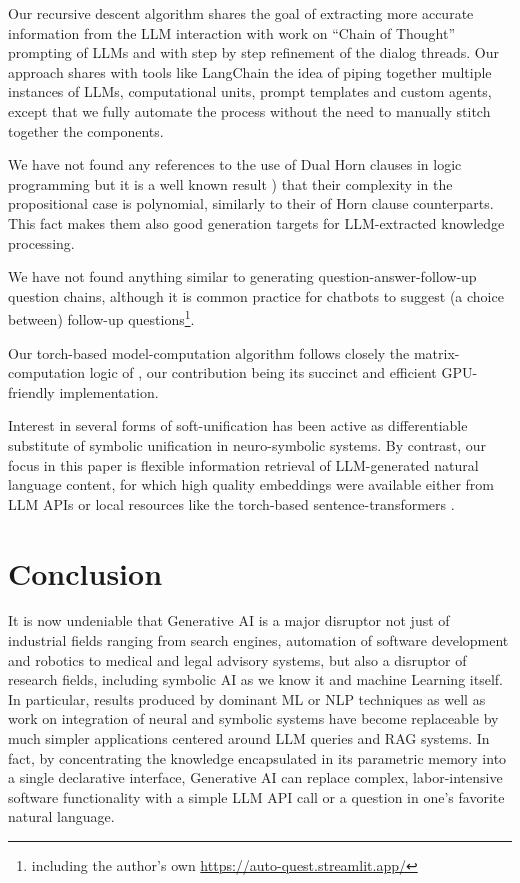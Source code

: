\documentclass[submission,copyright,creativecommons]{eptcs}
\begin{document}
Our recursive descent algorithm shares the goal of extracting more accurate information from the LLM interaction with work on ``Chain of Thought'' prompting of LLMs \cite{chainofthought,ling2023deductive} and with step by step \cite{lightman2023lets} refinement of the dialog threads. 
Our approach shares with tools like LangChain \cite{langchain} the idea of piping together multiple instances of LLMs, computational units, prompt templates and custom agents, except that we fully automate the process without the need to manually stitch together the components.

We have not found any references to the use of Dual Horn clauses in logic programming but it is a well known result \cite{schaefer78}) that their complexity in the propositional case is polynomial, similarly to their of Horn clause counterparts. This fact makes them also good generation targets for LLM-extracted knowledge processing. 

We have not found anything similar to generating question-answer-follow-up question chains, although it is common practice for chatbots to  suggest (a choice between) follow-up questions\footnote{ including the author's own \url{https://auto-quest.streamlit.app/}}.

Our torch-based model-computation algorithm follows closely the matrix-computation logic of \cite{linalg_lp}, our contribution being its succinct and efficient GPU-friendly implementation.

Interest in several forms of soft-unification has been active  \cite{soft_unif,ltn22,deepsoftlog23} as differentiable substitute of symbolic unification in neuro-symbolic systems.
By contrast, our focus in this paper is flexible information retrieval of LLM-generated natural language content, for which high quality embeddings were available either from LLM APIs or local resources like the torch-based sentence-transformers \cite{sbert}.

\section{Conclusion}\label{conc}

It is now undeniable that Generative AI is a major disruptor not just of industrial fields ranging from search engines, automation of software development and robotics to medical and legal advisory systems,
but also a disruptor of research fields, including symbolic AI as we know it and machine Learning itself. In particular, results produced by dominant ML or NLP techniques as well as work on integration of neural and symbolic systems have become replaceable
by much simpler applications centered around LLM queries and RAG systems.
In fact, by concentrating the knowledge encapsulated in its parametric memory into a single declarative interface, Generative AI can replace complex, labor-intensive  software functionality with a simple LLM API call or a question in one's favorite natural language.
\end{document}
